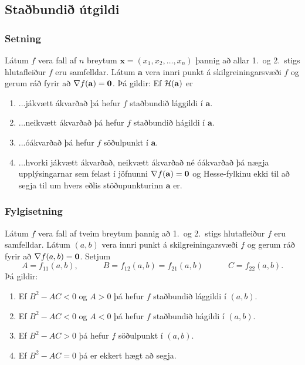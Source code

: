 

\subsection{Staðbundið útgildi} 

\subsubsection{Setning  }
 Látum $f$ vera fall af $n$ breytum $\mathbf{x} = (x_1,x_2,\ldots,x_n)$ þannig að allar
1.~og 2.~stigs hlutafleiður $f$ eru samfelldar.  Látum $\mathbf{a}$ vera
innri punkt á skilgreiningarsvæði $f$ og gerum ráð fyrir að $\nabla
f(\mathbf{a})=\mbox{${\bf 0}$}$.  Þá gildir: Ef ${\cal H}(\mathbf{a})$ er 
\begin {enumerate}
 \item  ...jákvætt ákvarðað þá hefur $f$ staðbundið
     lággildi í $\mathbf{a}$.
\item ...neikvætt ákvarðað þá hefur $f$ staðbundið
     hágildi í $\mathbf{a}$.
\item    ...óákvarðað þá hefur $f$ söðulpunkt í
      $\mathbf{a}$.  
\item ...hvorki jákvætt ákvarðað, neikvætt ákvarðað
      né óákvarðað þá nægja upplýsingarnar sem felast í jöfnunni
      $\nabla f(\mathbf{a})=\mbox{${\bf 0}$}$ og Hesse-fylkinu ekki til að segja til um
      hvers eðlis stöðupunkturinn $\mathbf{a}$ er.
\end {enumerate}






\subsubsection{Fylgisetning  }
Látum $f$ vera fall af tveim breytum þannig að
1.~og 2.~stigs hlutafleiður $f$ eru samfelldar.  Látum $(a,b)$ vera
innri punkt á skilgreiningarsvæði $f$ og gerum ráð fyrir að $\nabla
f(a,b)=\mbox{${\bf 0}$}$.  Setjum 
$$A=f_{11}(a,b),\qquad\quad B=f_{12}(a,b)=f_{21}(a,b)\qquad\quad
C=f_{22}(a,b).$$ 
Þá gildir:
\begin {enumerate}
 \item  Ef $B^2-AC<0$ og $A>0$  þá hefur $f$
     staðbundið lággildi í $(a,b)$.
 \item  Ef $B^2-AC<0$ og $A<0$ 
 þá hefur $f$ staðbundið
hágildi í $(a,b)$.
 \item   Ef $B^2-AC>0$ 
þá hefur $f$ söðulpunkt í
      $(a,b)$.  
 \item  Ef $B^2-AC=0$ þá er ekkert hægt að segja.  
\end {enumerate}



